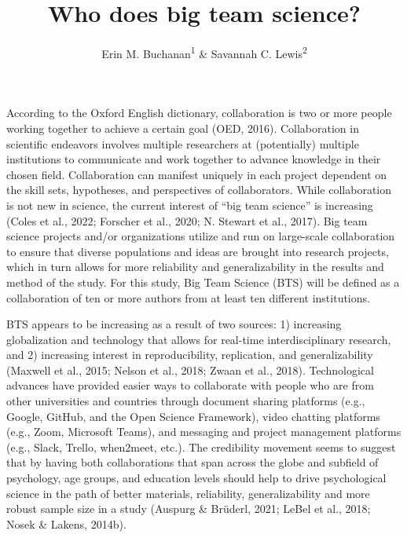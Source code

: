 \documentclass[
  man]{apa7}
\title{Who does big team science?}
\author{Erin M. Buchanan\textsuperscript{1} \& Savannah C. Lewis\textsuperscript{2}}
\date{}
\affiliation{\vspace{0.5cm}\textsuperscript{1} Harrisburg University of Science and Technology\\\textsuperscript{2} University of Alabama}
\begin{document}
\maketitle

According to the Oxford English dictionary, collaboration is two or more
people working together to achieve a certain goal (OED, 2016).
Collaboration in scientific endeavors involves multiple researchers at
(potentially) multiple institutions to communicate and work together to
advance knowledge in their chosen field. Collaboration can manifest
uniquely in each project dependent on the skill sets, hypotheses, and
perspectives of collaborators. While collaboration is not new in
science, the current interest of ``big team science'' is increasing
(Coles et al., 2022; Forscher et al., 2020; N. Stewart et al., 2017). Big team science projects
and/or organizations utilize and run on large-scale collaboration to
ensure that diverse populations and ideas are brought into research
projects, which in turn allows for more reliability and generalizability
in the results and method of the study. For this study, Big Team Science
(BTS) will be defined as a collaboration of ten or more authors from at
least ten different institutions.

BTS appears to be increasing as a result of two sources: 1) increasing
globalization and technology that allows for real-time interdisciplinary
research, and 2) increasing interest in reproducibility, replication,
and generalizability (Maxwell et al., 2015; Nelson et al., 2018; Zwaan et al., 2018).
Technological advances have provided easier ways to collaborate with
people who are from other universities and countries through document
sharing platforms (e.g., Google, GitHub, and the Open Science
Framework), video chatting platforms (e.g., Zoom, Microsoft Teams), and
messaging and project management platforms (e.g., Slack, Trello,
when2meet, etc.). The credibility movement seems to suggest that by
having both collaborations that span across the globe and subfield of
psychology, age groups, and education levels should help to drive
psychological science in the path of better materials, reliability,
generalizability and more robust sample size in a study
(Auspurg \& Brüderl, 2021; LeBel et al., 2018; Nosek \& Lakens, 2014b).
\end{document}
